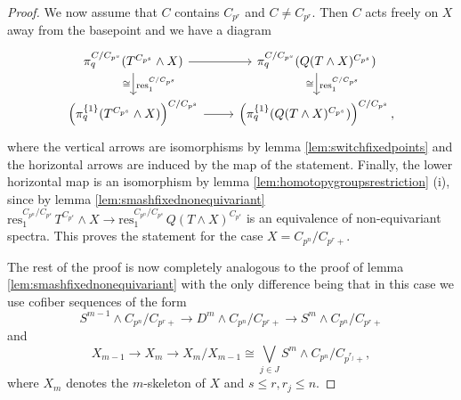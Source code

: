 \begin{proof}
We now assume that $C$ contains $C_{p^r}$ and $C\neq C_{p^r}$. Then
$C$ acts freely on $X$ away from the basepoint and we have a diagram
\[
\begin{tikzcd}
\pi_q^{C/C_{p^s}}(T^{C_{p^s}}\wedge X)
\arrow{r}\arrow{d}[swap]{\cong}{\mathrm{res}^{C/C_{p^s}}_1}
&\pi_q^{C/C_{p^s}}(Q(T\wedge X)^{C_{p^s}})
\arrow{d}[swap]{\cong}{\mathrm{res}^{C/C_{p^s}}_1}\\
\left(\pi_q^{\{1\}}(T^{C_{p^s}}\wedge X)\right)^{C/C_{p^s}}
\arrow{r}
&\left(\pi_q^{\{1\}}(Q(T\wedge X)^{C_{p^s}})\right)^{C/C_{p^s}},
\end{tikzcd}
\]
where the vertical arrows are isomorphisms by lemma
\ref{lem:switchfixedpoints} and the horizontal arrows are induced by the map
of the statement. Finally, the lower horizontal map is an isomorphism by lemma
\ref{lem:homotopygroupsrestriction} (i),
since  by lemma \ref{lem:smashfixednonequivariant} 
$\mathrm{res}^{C_{p^n}/C_{p^s}}_1\, T^{C_{p^s}}\wedge X
\to \mathrm{res}^{C_{p^n}/C_{p^s}}_1\, Q(T\wedge X)^{C_{p^s}}$ 
is an equivalence of non-equivariant spectra. This proves the statement
for the case $X = C_{p^n}/C_{p^r+}$.

The rest of the proof is now completely analogous to the proof of
lemma \ref{lem:smashfixednonequivariant} with the only difference
being that in this case we use cofiber sequences of the form
\[
S^{m-1}\wedge C_{p^n}/C_{p^r+}\to D^m \wedge C_{p^n}/C_{p^r+}\to
S^m\wedge C_{p^n}/C_{p^r+}
\]
and
\[
X_{m-1}\to X_m\to X_m/X_{m-1}\cong \bigvee_{j\in J} S^m \wedge C_{p^n}/C_{p^{r_j}+},
\]
where $X_m$ denotes the $m$-skeleton of $X$ and $s\le r, r_j\le n$.
\end{proof}
